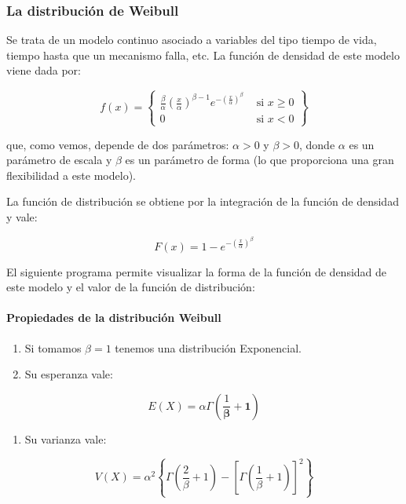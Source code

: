 \documentclass[
]{article}
\providecommand{\tightlist}{%
  \setlength{\itemsep}{0pt}\setlength{\parskip}{0pt}}
\begin{document}
\subsubsection{La distribución de Weibull}\label{la-distribuciuxf3n-de-weibull}

Se trata de un modelo continuo asociado a variables del tipo tiempo de vida, tiempo hasta que un mecanismo falla, etc. La función de densidad de este modelo viene dada por:

\[
f(x)=\left\{\begin{array}{ll}
\frac{\beta}{\alpha}\left(\frac{x}{\alpha}\right)^{\beta-1} e^{-\left(\frac{x}{\alpha}\right)^{\beta}} & \text { si } x \geq 0 \\
0 & \text { si } x<0
\end{array}\right\}
\]

que, como vemos, depende de dos parámetros: \(\alpha>0\) y \(\beta>0\), donde \(\alpha\) es un parámetro de escala y \(\beta\) es un parámetro de forma (lo que proporciona una gran flexibilidad a este modelo).

La función de distribución se obtiene por la integración de la función de densidad y vale:

\[
F(x)=1-e^{-\left(\frac{x}{\alpha}\right)^{\beta}}
\]

El siguiente programa permite visualizar la forma de la función de densidad de este modelo y el valor de la función de distribución:

\paragraph{Propiedades de la distribución Weibull}\label{propiedades-de-la-distribuciuxf3n-weibull}

\begin{enumerate}
\def\labelenumi{\arabic{enumi}.}
\item
  Si tomamos \(\beta=1\) tenemos una distribución Exponencial.
\item
  Su esperanza vale:
\end{enumerate}

\[
E(X)=\alpha \Gamma\left(\frac{1}{\boldsymbol{\beta}}+\mathbf{1}\right)
\]

\begin{enumerate}
\def\labelenumi{\arabic{enumi}.}
\setcounter{enumi}{2}
\tightlist
\item
  Su varianza vale:
\end{enumerate}

\[
V(X)=\alpha^{2}\left\{\Gamma\left(\frac{2}{\beta}+1\right)-\left[\Gamma\left(\frac{1}{\beta}+1\right)\right]^{2}\right\}
\]
\end{document}
